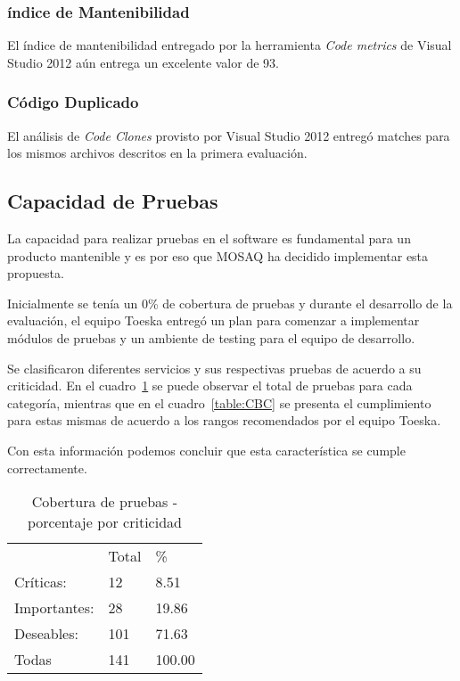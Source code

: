 \subsubsection{índice de Mantenibilidad}
El índice de mantenibilidad entregado por la herramienta \textit{Code metrics} de Visual Studio 2012
aún entrega un excelente valor de 93.
\subsubsection{Código Duplicado}
El análisis de \textit{Code Clones} provisto por Visual Studio 2012 entregó matches para los
mismos archivos descritos en la primera evaluación.
\subsection{Capacidad de Pruebas}
\label{cap}

La capacidad para realizar pruebas en el software es fundamental para un producto mantenible y es por eso
que MOSAQ ha decidido implementar esta propuesta.

Inicialmente se tenía un 0\% de cobertura de pruebas y durante el desarrollo de
la evaluación, el equipo Toeska entregó un plan para comenzar a implementar
módulos de pruebas y un ambiente de testing para el equipo de desarrollo.

Se clasificaron diferentes servicios y sus respectivas pruebas de acuerdo a su criticidad.
En el cuadro~\ref{table:CBPC} se puede observar el total de pruebas para cada
categoría, mientras que en el cuadro~\ref{table:CBC} se presenta el cumplimiento
para estas mismas de acuerdo a los rangos recomendados por el equipo Toeska.

Con esta información podemos concluir que esta característica se cumple correctamente.
\begin{table}
  \small
\centering
    \begin{tabular}{lll}
    ~               & Total  & \%        \\
     		Críticas:    &  		12  &  		8.51   \\
     		Importantes: &  		28  &  		19.86  \\
     		Deseables:   &  		101 &  		71.63  \\
     		Todas        &  		141 &  		100.00 \\ \hline
    \end{tabular}
     \caption{Cobertura de pruebas - porcentaje por criticidad}
    \label{table:CBPC}
\end{table}

